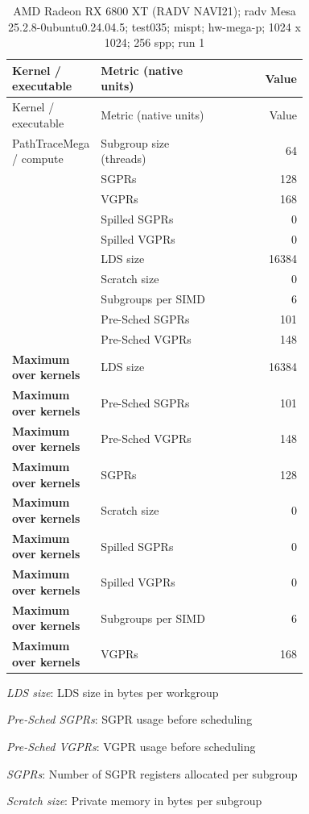 \begin{longtable}{p{0.30\linewidth}p{0.43\linewidth}r}
\caption{AMD Radeon RX 6800 XT (RADV NAVI21); radv Mesa 25.2.8-0ubuntu0.24.04.5; test035; mispt; hw-mega-p; 1024 x 1024; 256 spp; run 1}\label{tab:hydra-profile-20}\\
\hline Kernel / executable & Metric (native units) & Value \\\hline
\endfirsthead
\hline Kernel / executable & Metric (native units) & Value \\\hline
\endhead
PathTraceMega / compute & Subgroup size (threads) & 64 \\
 & SGPRs & 128 \\
 & VGPRs & 168 \\
 & Spilled SGPRs & 0 \\
 & Spilled VGPRs & 0 \\
 & LDS size & 16384 \\
 & Scratch size & 0 \\
 & Subgroups per SIMD & 6 \\
 & Pre-Sched SGPRs & 101 \\
 & Pre-Sched VGPRs & 148 \\
\hline
\textbf{Maximum over kernels} & LDS size & 16384 \\
\textbf{Maximum over kernels} & Pre-Sched SGPRs & 101 \\
\textbf{Maximum over kernels} & Pre-Sched VGPRs & 148 \\
\textbf{Maximum over kernels} & SGPRs & 128 \\
\textbf{Maximum over kernels} & Scratch size & 0 \\
\textbf{Maximum over kernels} & Spilled SGPRs & 0 \\
\textbf{Maximum over kernels} & Spilled VGPRs & 0 \\
\textbf{Maximum over kernels} & Subgroups per SIMD & 6 \\
\textbf{Maximum over kernels} & VGPRs & 168 \\
\hline
\end{longtable}
\noindent\textit{LDS size}: LDS size in bytes per workgroup\par
\noindent\textit{Pre-Sched SGPRs}: SGPR usage before scheduling\par
\noindent\textit{Pre-Sched VGPRs}: VGPR usage before scheduling\par
\noindent\textit{SGPRs}: Number of SGPR registers allocated per subgroup\par
\noindent\textit{Scratch size}: Private memory in bytes per subgroup\par
